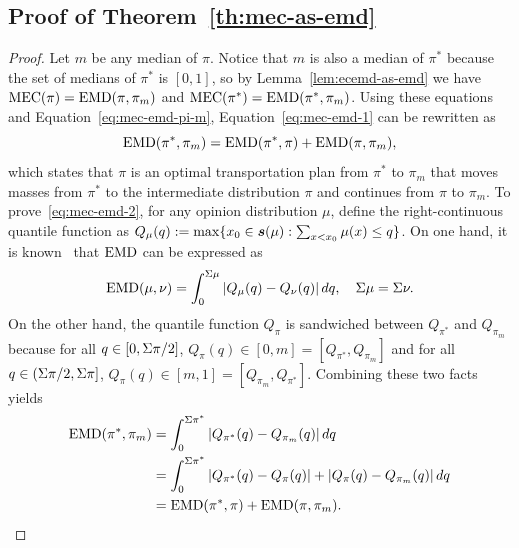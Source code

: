 \subsection{Proof of Theorem~\ref{th:mec-as-emd}}
\label{appendix:proof-mec-as-emd}

\mecAsEmd*
\begin{proof}
Let $m$ be any median of $\pi$. Notice that $m$ is also a median of $\pi^*$ because the set of medians of $\pi^*$ is $[0,1]$, so by Lemma~\ref{lem:ecemd-as-emd} we have $\MECEMD(\pi)=\EMD(\pi,\pi_m)$ and $\MECEMD(\pi^*)=\EMD(\pi^*,\pi_m)$.
Using these equations and Equation~\eqref{eq:mec-emd-pi-m}, Equation~\eqref{eq:mec-emd-1} can be rewritten as
\begin{equation}
\operatorname{EMD}(\pi^*, \pi_m)=\operatorname{EMD}(\pi^*, \pi) + \operatorname{EMD}(\pi,\pi_m),
\label{eq:mec-emd-2}
\end{equation}
which states that $\pi$ is an optimal transportation plan from $\pi^*$ to $\pi_m$ that moves masses from $\pi^*$ to the intermediate distribution $\pi$ and continues from $\pi$ to $\pi_m$.
To prove~\eqref{eq:mec-emd-2}, for any opinion distribution $\mu$, define the right-continuous quantile function as $Q_\mu(q) := \max\{x_0\in\boldsymbol{s}(\mu): \sum_{x<x_0} \mu(x) \leq q\}$.
On one hand, it is known~\cite{geher2020isometric,vallender1974calculation} that $\operatorname{EMD}$ can be expressed as
\begin{equation}
\operatorname{EMD}(\mu, \nu) = \int_0^{\Sigma \mu} |Q_\mu(q)-Q_\nu(q)|\,dq, \quad \Sigma \mu=\Sigma \nu.
\label{eq:mec-emd-3}
\end{equation}
On the other hand, the quantile function $Q_\pi$ is sandwiched between $Q_{\pi^*}$ and $Q_{\pi_m}$ because for all $q\in[0,\Sigma \pi/2]$, $Q_\pi(q)\in[0,m] = [Q_{\pi^*}, Q_{\pi_m}]$ and for all $q\in(\Sigma \pi/2, \Sigma \pi]$, $Q_\pi(q)\in[m,1] = [Q_{\pi_m}, Q_{\pi^*}]$.
Combining these two facts yields
\[
\begin{aligned}
  \operatorname{EMD}(\pi^*,\pi_m) &= \int_0^{\Sigma \pi^*} |Q_{\pi^*}(q)-Q_{\pi_m}(q)|\,dq\\
  &= \int_0^{\Sigma \pi^*} |Q_{\pi^*}(q)-Q_\pi(q)| + |Q_\pi(q)-Q_{\pi_m}(q)|\,dq\\
  &= \operatorname{EMD}(\pi^*,\pi) + \operatorname{EMD}(\pi,\pi_m).
\end{aligned}
\]
\end{proof}
